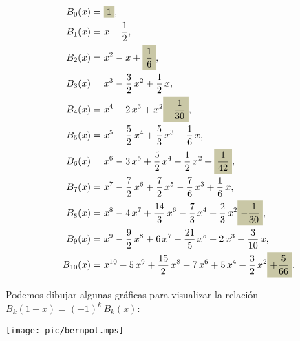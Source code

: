 \documentclass{article}
\numberwithin{equation}{section}
\newcommand{\highlight}[1]{\colorbox{shadecolor}{$\displaystyle #1$}}
\theoremstyle{definition}
\begin{document}
\begin{align*}
  B_0 (x) & = \highlight{1}, \\
  B_1 (x) & = x - \frac{1}{2}, \\
  B_2 (x) & = x^2 - x + \highlight{\frac{1}{6}}, \\
  B_3 (x) & = x^3 - \frac{3}{2}\,x^2 + \frac{1}{2}\,x,\\
  B_4 (x) & = x^4 - 2\,x^3 + x^2 \highlight{- \frac{1}{30}}, \\
  B_5 (x) & = x^5 - \frac{5}{2}\,x^4 + \frac{5}{3}\,x^3 - \frac{1}{6}\,x, \\
  B_6 (x) & = x^6 - 3\,x^5 + \frac{5}{2}\,x^4 - \frac{1}{2}\,x^2 + \highlight{\frac{1}{42}},\\
  B_7 (x) & = x^7 - \frac{7}{2}\,x^6 + \frac{7}{2}\,x^5 - \frac{7}{6}\,x^3 + \frac{1}{6}\,x, \\
  B_8 (x) & = x^8 - 4\,x^7 + \frac{14}{3}\,x^6 - \frac{7}{3}\,x^4 + \frac{2}{3}\,x^2 \highlight{- \frac{1}{30}},\\
  B_9 (x) & = x^9 - \frac{9}{2}\,x^8 + 6\,x^7 - \frac{21}{5}\,x^5 + 2\,x^3 - \frac{3}{10}\,x, \\
  B_{10} (x) & = x^{10} - 5\,x^9 + \frac{15}{2}\,x^8 - 7\,x^6 + 5\,x^4 - \frac{3}{2}\,x^2 \highlight{+ \frac{5}{66}}.
\end{align*}

\vspace{\fill}

Podemos dibujar algunas gráficas para visualizar la relación
$B_k (1-x) = (-1)^k \, B_k (x)$:

\begin{center}
  \texttt{[image: pic/bernpol.mps]}
\end{center}

\pagebreak
\end{document}
